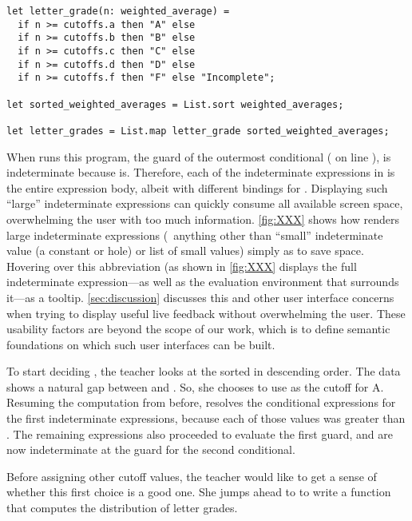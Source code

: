 \begin{lstlisting}
let letter_grade(n: weighted_average) =
  if n >= cutoffs.a then "A" else
  if n >= cutoffs.b then "B" else
  if n >= cutoffs.c then "C" else
  if n >= cutoffs.d then "D" else
  if n >= cutoffs.f then "F" else "Incomplete";

let sorted_weighted_averages = List.sort weighted_averages;

let letter_grades = List.map letter_grade sorted_weighted_averages;
\end{lstlisting}

\noindent
%
When \HazelnutLive{} runs this program, the guard of the outermost conditional
( on line ), is indeterminate because 
is.
%
Therefore, each of the indeterminate expressions in  is the
entire expression body, albeit with different bindings for .
%
Displaying such ``large'' indeterminate expressions can quickly consume all
available screen space, overwhelming the user with too much information.
%
\autoref{fig:XXX} shows how \HazelnutLive{} renders large indeterminate
expressions (\ie{}~anything other than ``small'' indeterminate value (a constant
or hole) or list of small values) simply as  to save space.
%
Hovering over this abbreviation (as shown in \autoref{fig:XXX} displays the full
indeterminate expression---as well as the evaluation environment that surrounds
it---as a tooltip.
%
\autoref{sec:discussion} discusses this and other user interface concerns when
trying to display useful live feedback without overwhelming the user.
%
These usability factors are beyond the scope of our work, which is to define
semantic foundations on which such user interfaces can be built.

To start deciding , the teacher looks at the 
sorted in descending order.
%
The data shows a natural gap between  and .
%
So, she chooses to use  as the cutoff for A.
%
Resuming the computation from before, \HazelnutLive{} resolves the conditional
expressions for the first  indeterminate expressions, because each of
those  values was greater than .
%
The remaining  expressions also proceeded to evaluate the first guard,
and are now indeterminate at the guard for the second conditional.

Before assigning other cutoff values, the teacher would like to get a sense of
whether this first choice is a good one.
%
She jumps ahead to to write a function that computes the distribution of letter
grades.

